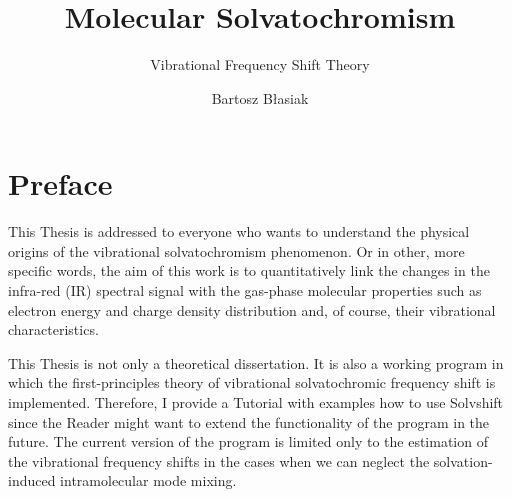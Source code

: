 \documentclass[a4paper,titlepage,twoside,fleqn,12pt]{book}
\title{Molecular Solvatochromism}
\subtitle{Vibrational Frequency Shift Theory}
\author{Bartosz B{\l}asiak}
\begin{document}
\graphicspath{{figures/}}
\maketitle
\tableofcontents

\chapter*{Preface}

This Thesis is addressed to everyone who wants to understand the physical
origins of the vibrational solvatochromism phenomenon. Or in other, more specific words, 
the aim of this work is to quantitatively link the changes in the infra\hyp{}red (IR)
spectral signal with the gas-phase molecular properties such as electron energy and charge
density distribution and, of course, their vibrational characteristics. 

This Thesis is not only a theoretical dissertation. It is also a working program 
in which the first-principles theory of vibrational solvatochromic frequency shift is 
implemented. Therefore, I provide a Tutorial with examples how to use {\sc Solvshift} 
since the Reader might want to extend the functionality of the program in the future.
The current version of the program is limited only to the estimation of the vibrational frequency 
shifts in the cases when we can neglect the solvation-induced intramolecular mode mixing.

\end{document}
